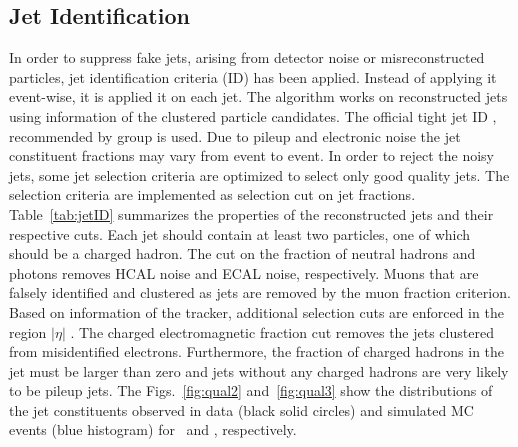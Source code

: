 \subsection{Jet Identification}
In order to suppress fake jets, arising from detector noise or misreconstructed particles, jet identification criteria (ID) has been applied. Instead of applying it event-wise, it  is applied it on each jet. The algorithm works on reconstructed jets using information of the clustered particle candidates. The official tight jet ID \cite{CMS:2010xta}, recommended by \JetMet group \cite{JetID} is used. Due to pileup and electronic noise the jet constituent fractions may vary from event to event. In order to reject the noisy jets, some jet selection criteria are optimized to select only good quality jets. The selection criteria are implemented as selection cut on jet fractions. Table~\ref{tab:jetID} summarizes the properties of the reconstructed jets and their respective cuts. Each jet should contain at least two particles, one of which should be a charged hadron. The cut on the fraction of neutral hadrons and photons removes HCAL noise and ECAL noise, respectively. Muons that are falsely identified and clustered as jets are removed by the muon fraction criterion. Based on information of the tracker, additional selection cuts are enforced in the region $|\eta|$ . The charged electromagnetic fraction cut removes the jets clustered from misidentified electrons. Furthermore, the fraction of charged hadrons in the jet must be larger than zero and jets without any charged hadrons are very likely to be pileup jets. The Figs.~\ref{fig:qual2} and~\ref{fig:qual3} show the distributions of the jet constituents observed in data (black solid circles) and simulated MC events (blue histogram) for \njt~and \njth, respectively.

